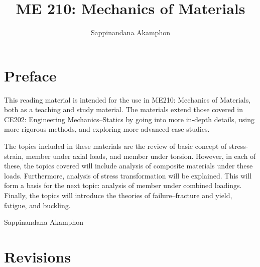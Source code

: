 \documentclass[
10pt,
a4paper,
openany,
svgnames,
]{kaobook} %
\author{Sappinandana Akamphon}
\title{ME 210: Mechanics of Materials}
\begin{document}
\frontmatter

\restoregeometry %
\nopagecolor%

\chapter*{Preface}

This reading material is intended for the use in ME210: Mechanics of Materials, both as a teaching and study material. The materials extend those covered in CE202: Engineering Mechanics--Statics by going into more in-depth details, using more rigorous methods, and exploring more advanced case studies.

The topics included in these materials are the review of basic concept of stress-strain, member under axial loads, and member under torsion. However, in each of these, the topics covered will include analysis of composite materials under these loads. Furthermore, analysis of stress transformation will be explained. This will form a basis for the next topic: analysis of member under combined loadings. Finally, the topics will introduce the theories of failure--fracture and yield, fatigue, and buckling.

\vspace{3cm} \hspace{9cm}
Sappinandana Akamphon

\chapter*{Revisions}
\end{document}
